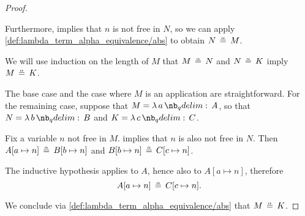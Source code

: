 \begin{proof}
\begin{itemize}
    Furthermore,  implies that \( n \) is not free in \( N \), so we can apply \ref{def:lambda_term_alpha_equivalence/abs} to obtain \( N \aequiv M \).
  \end{itemize}

   We will use induction on the length of \( M \) that \( M \aequiv N \) and \( N \aequiv K \) imply \( M \aequiv K \).

  The base case and the case where \( M \) is an application are straightforward. For the remaining case, suppose that \( M = \qabs a A \), so that \( N = \qabs b B \) and \( K = \qabs c C \).

  Fix a variable \( n \) not free in \( M \).  implies that \( n \) is also not free in \( N \). Then \( A[a \mapsto n] \aequiv B[b \mapsto n] \) and \( B[b \mapsto n] \aequiv C[c \mapsto n] \).

  The inductive hypothesis applies to \( A \), hence also to \( A[a \mapsto n] \), therefore
  \begin{equation*}
    A[a \mapsto n] \aequiv C[c \mapsto n].
  \end{equation*}

  We conclude via \ref{def:lambda_term_alpha_equivalence/abs} that \( M \aequiv K \).
\end{proof}

